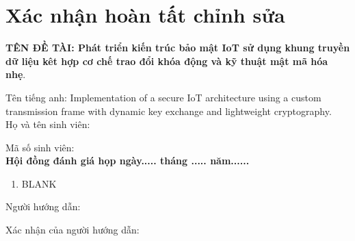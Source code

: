 \chapter*{Xác nhận hoàn tất chỉnh sửa}
{\textbf{TÊN ĐỀ TÀI: Phát triển kiến trúc bảo mật IoT sử dụng khung truyền dữ liệu kêt hợp cơ chế trao đổi khóa động và kỹ thuật mật mã hóa nhẹ}.}

{\small Tên tiếng anh: Implementation of a secure IoT architecture using a custom transmission frame with dynamic key exchange and lightweight cryptography.}\\[.1 cm]

Họ và tên sinh viên: \tenSV

Mã số sinh viên: \mssv \\[.1 cm]

\textbf{Hội đồng đánh giá họp ngày..... tháng ..... năm......}

\begin{enumerate}
    \item BLANK
\end{enumerate}

\vspace{.2 cm}
Người hướng dẫn: \tenGVHD

Xác nhận của người hướng dẫn: